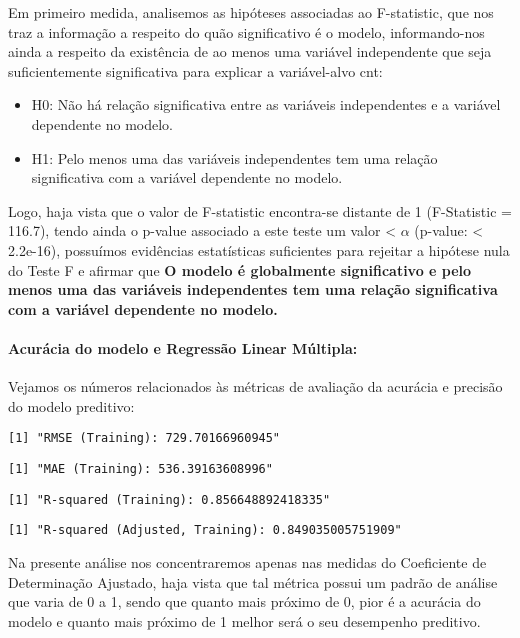 \documentclass[
  letterpaper,
  DIV=11,
  numbers=noendperiod]{scrartcl}
\let\oldparagraph\paragraph
\renewcommand{\paragraph}[1]{\oldparagraph{#1}\mbox{}}
\begin{document}
Em primeiro medida, analisemos as hipóteses associadas ao F-statistic,
que nos traz a informação a respeito do quão significativo é o modelo,
informando-nos ainda a respeito da existência de ao menos uma variável
independente que seja suficientemente significativa para explicar a
variável-alvo cnt:

\begin{itemize}
\item
  H0: Não há relação significativa entre as variáveis independentes e a
  variável dependente no modelo.
\item
  H1: Pelo menos uma das variáveis independentes tem uma relação
  significativa com a variável dependente no modelo.
\end{itemize}

Logo, haja vista que o valor de F-statistic encontra-se distante de 1
(F-Statistic = 116.7), tendo ainda o p-value associado a este teste um
valor \textless{} \(\alpha\) (p-value: \textless{} 2.2e-16), possuímos
evidências estatísticas suficientes para rejeitar a hipótese nula do
Teste F e afirmar que \textbf{O modelo é globalmente significativo e
pelo menos uma das variáveis independentes tem uma relação significativa
com a variável dependente no modelo.}

\paragraph{Acurácia do modelo e Regressão Linear
Múltipla:}\label{acuruxe1cia-do-modelo-e-regressuxe3o-linear-muxfaltipla}

Vejamos os números relacionados às métricas de avaliação da acurácia e
precisão do modelo preditivo:

\begin{verbatim}
[1] "RMSE (Training): 729.70166960945"
\end{verbatim}

\begin{verbatim}
[1] "MAE (Training): 536.39163608996"
\end{verbatim}

\begin{verbatim}
[1] "R-squared (Training): 0.856648892418335"
\end{verbatim}

\begin{verbatim}
[1] "R-squared (Adjusted, Training): 0.849035005751909"
\end{verbatim}

Na presente análise nos concentraremos apenas nas medidas do Coeficiente
de Determinação Ajustado, haja vista que tal métrica possui um padrão de
análise que varia de 0 a 1, sendo que quanto mais próximo de 0, pior é a
acurácia do modelo e quanto mais próximo de 1 melhor será o seu
desempenho preditivo.
\end{document}
